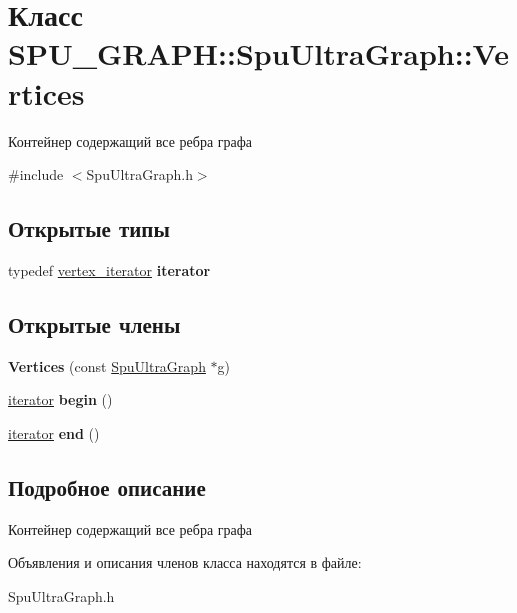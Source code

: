\hypertarget{class_s_p_u___g_r_a_p_h_1_1_spu_ultra_graph_1_1_vertices}{}\section{Класс S\+P\+U\+\_\+\+G\+R\+A\+PH\+:\+:Spu\+Ultra\+Graph\+:\+:Vertices}
\label{class_s_p_u___g_r_a_p_h_1_1_spu_ultra_graph_1_1_vertices}


Контейнер содержащий все ребра графа  




{\ttfamily \#include $<$Spu\+Ultra\+Graph.\+h$>$}

\subsection*{Открытые типы}
\begin{DoxyCompactItemize}
\item 
\mbox{\label{class_s_p_u___g_r_a_p_h_1_1_spu_ultra_graph_1_1_vertices_a749538579b8dbb828f054e0d21566e19}} 
typedef \hyperlink{class_s_p_u___g_r_a_p_h_1_1_spu_ultra_graph_a06163cbc87b2e49334b4bcc46c7b0c89}{vertex\+\_\+iterator} {\bfseries iterator}
\end{DoxyCompactItemize}
\subsection*{Открытые члены}
\begin{DoxyCompactItemize}
\item 
\mbox{\label{class_s_p_u___g_r_a_p_h_1_1_spu_ultra_graph_1_1_vertices_a6419ca4f357385cd5693df5ed1c59aa2}} 
{\bfseries Vertices} (const \hyperlink{class_s_p_u___g_r_a_p_h_1_1_spu_ultra_graph}{Spu\+Ultra\+Graph} $\ast$g)
\item 
\mbox{\label{class_s_p_u___g_r_a_p_h_1_1_spu_ultra_graph_1_1_vertices_a845ca204fed6736b8aae37ad434305f0}} 
\hyperlink{class_s_p_u___g_r_a_p_h_1_1_spu_ultra_graph_1_1_vertex_iterator}{iterator} {\bfseries begin} ()
\item 
\mbox{\label{class_s_p_u___g_r_a_p_h_1_1_spu_ultra_graph_1_1_vertices_adb424c5238d309370ccb0a6a6dbf7b07}} 
\hyperlink{class_s_p_u___g_r_a_p_h_1_1_spu_ultra_graph_1_1_vertex_iterator}{iterator} {\bfseries end} ()
\end{DoxyCompactItemize}


\subsection{Подробное описание}
Контейнер содержащий все ребра графа 

Объявления и описания членов класса находятся в файле\+:\begin{DoxyCompactItemize}
\item 
Spu\+Ultra\+Graph.\+h\end{DoxyCompactItemize}
